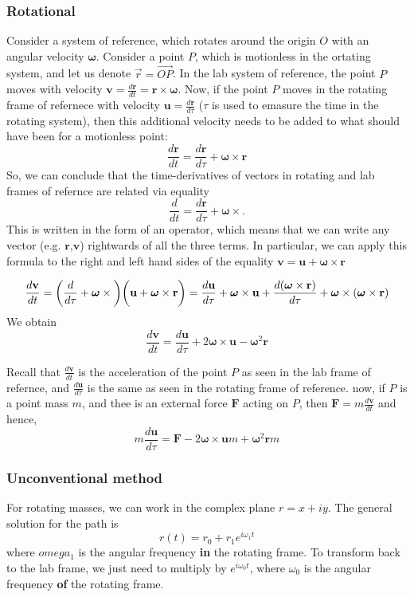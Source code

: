 \subsubsection{Rotational}
Consider a system of reference, which rotates around the origin $O$ with an angular velocity $\boldsymbol{\omega}$. Consider a point $P$, which is motionless in the ortating system, and let us denote $\vec{r}=\vec{OP}$.
In the lab system of reference, the point $P$ moves with velocity $\mathbf{v}=\frac{d\mathbf{r}}{dt}=\mathbf{r} \times \boldsymbol{\omega}$. Now, if the point $P$ moves in the rotating frame of refernece with velocity $\mathbf{u}=\frac{d\mathbf{r}}{d\tau}$ ($\tau$ is used to emasure the time in the rotating system), then this additional velocity needs to be added to what should have been for a motionless point:
$$\frac{d\mathbf{r}}{dt}=\frac{d\mathbf{r}}{d\tau}+\boldsymbol{\omega}\times \mathbf{r}$$
So, we can conclude that the time-derivatives of vectors in rotating and lab frames of refernce are related via equality
$$\frac{d}{dt}=\frac{d\mathbf{r}}{d\tau}+\boldsymbol{\omega}\times . $$
This is written in the form of an operator, which means that we can write any vector (e.g. $\mathbf{r}$,$\mathbf{v}$) rightwards of all the three terms. In particular, we can apply this formula to the right and left hand sides of the equality $\mathbf{v}=\mathbf{u}+\boldsymbol{\omega} \times \mathbf{r}$

$$\frac{d\mathbf{v}}{dt}=\bigg(\frac{d}{d\tau}+\boldsymbol{\omega}\times\bigg)\bigg(\mathbf{u}+\boldsymbol{\omega}\times\mathbf{r}\bigg)
    \\
    = \frac{d\mathbf{u}}{d\tau}+\boldsymbol{\omega}\times\mathbf{u}+\frac{d(\boldsymbol{\omega}\times \mathbf{r})}{d\tau}+\boldsymbol{\omega}\times(\boldsymbol{\omega}\times \mathbf{r})$$
We obtain
$$\frac{d\mathbf{v}}{dt}=\frac{d\mathbf{u}}{d\tau}+2\boldsymbol{\omega}\times\mathbf{u}-\boldsymbol{\omega}^2\mathbf{r}$$

Recall that $\frac{d\mathbf{v}}{dt}$ is the acceleration of the point $P$ as seen in the lab frame of refernce, and $\frac{d\mathbf{u}}{d\tau}$ is the same as seen in the rotating frame of reference. now, if $P$ is a point mass $m$, and thee is an external force $\mathbf{F}$ acting on $P$, then $\mathbf{F}=m\frac{d\mathbf{v}}{dt}$ and hence,
\begin{equation}
    m\frac{d\mathbf{u}}{d\tau}=\mathbf{F}-2\boldsymbol{\omega}\times\mathbf{u}m+\boldsymbol{\omega}^2\mathbf{r}m
\end{equation}
\subsubsection{Unconventional method}
For rotating masses, we can work in the complex plane $r=x+iy$. The general solution for the path is 
\begin{equation}
    r(t)=r_0 + r_1 e^{i\omega_1 t}
\end{equation}
where $omega_1$ is the angular frequency \textbf{in} the rotating frame. 
To transform back to the lab frame, we just need to multiply by $e^{i\omega_0t}$, where $\omega_0$ is the angular frequency \textbf{of} the rotating frame.

